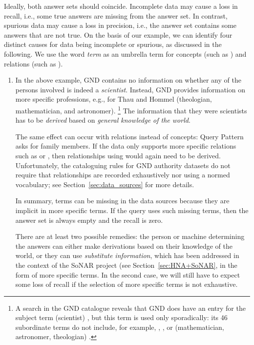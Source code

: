 Ideally, both answer sets should coincide.
Incomplete data may cause a loss in recall, i.e., some true answers are missing from the answer set.
In contrast, spurious data may cause a loss in precision, i.e., the answer set contains some answers that are not true.
On the basis of our example, we can identify four distinct causes for data being incomplete or spurious,
as discussed in the following. We use the word \emph{term} as an umbrella term for concepts (such as )
and relations (such as ).
%
\begin{enumerate}
  \item
    In the above example, \gls{GND} contains no information on whether any of the persons involved is indeed
    a \emph{scientist}. Instead, \gls{GND} provides information on more specific professions,
    e.g., for \foreignlanguage{ngerman}{Thau} and \foreignlanguage{ngerman}{Hommel} (theologian, mathematician, and astronomer).%
    \footnote{%
      A search in the \gls{GND} catalogue
      reveals that \gls{GND} does have an entry for the subject term  (scientist) \autocite{GNDScientist},
      but this term is used only sporadically: its 46 subordinate terms do not include, for example,
      , ,
      or  (mathematician, astronomer, theologian)  \autocite{GNDScientistSub}.%
    }
    The information that they were scientists has to be \emph{derived} based on \emph{general knowledge
    of the world}.
    
    The same effect can occur with relations instead of concepts:
    Query Pattern~ asks for family members.
    If the data only supports more specific relations
    such as  or , then relationships using
     would again need to be derived.
    Unfortunately, the cataloguing rules for \gls{GND} authority datasets do not require
    that relationships are recorded exhaustively nor using a normed vocabulary;
    see Section~\ref{sec:data_sources} for more details.
    
    In summary, terms can be missing in the data sources because
    they are implicit in more specific terms.
    If the query uses such missing terms, then the answer set is always empty
    and the recall is zero.
    
    There are at least two possible remedies:
    the person or machine determining the answers can either make derivations based on their
    knowledge of the world, or they can use \emph{substitute information},
    which has been addressed in the context of the \gls{SoNAR} project (see Section~\ref{sec:HNA+SoNAR},
    in the form of more specific terms.
    In the second case, we will still have to expect some loss of recall
    if the selection of more specific terms is not exhaustive.


\end{enumerate}
